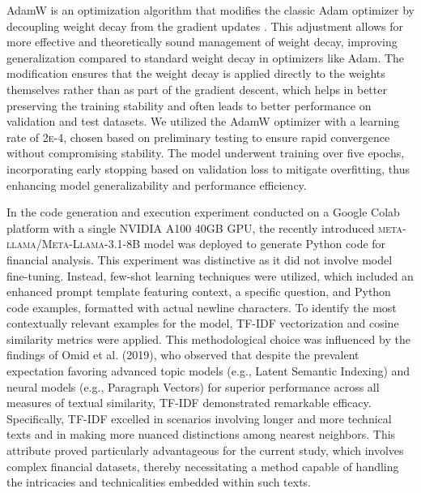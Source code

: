 \documentclass[logo,msc]{infthesis}           %
\begin{document}
AdamW is an optimization algorithm that modifies the classic Adam optimizer by decoupling weight decay from the gradient updates \cite{loshchilov2019decoupledweightdecayregularization}. This adjustment allows for more effective and theoretically sound management of weight decay, improving generalization compared to standard weight decay in optimizers like Adam. The modification ensures that the weight decay is applied directly to the weights themselves rather than as part of the gradient descent, which helps in better preserving the training stability and often leads to better performance on validation and test datasets. We utilized the AdamW optimizer with a learning rate of \textsc{2e-4}, chosen based on preliminary testing to ensure rapid convergence without compromising stability. The model underwent training over five epochs, incorporating early stopping based on validation loss to mitigate overfitting, thus enhancing model generalizability and performance efficiency.

In the code generation and execution experiment conducted on a Google Colab platform with a single NVIDIA A100 40GB GPU, the recently introduced \textsc{meta-llama/Meta-Llama-3.1-8B} model was deployed to generate Python code for financial analysis. This experiment was distinctive as it did not involve model fine-tuning. Instead, few-shot learning techniques were utilized, which included an enhanced prompt template featuring context, a specific question, and Python code examples, formatted with actual newline characters. To identify the most contextually relevant examples for the model, TF-IDF vectorization \cite{8999168} and cosine similarity metrics were applied. This methodological choice was influenced by the findings of Omid et al. (2019), who observed that despite the prevalent expectation favoring advanced topic models (e.g., Latent Semantic Indexing) and neural models (e.g., Paragraph Vectors) for superior performance across all measures of textual similarity, TF-IDF demonstrated remarkable efficacy. Specifically, TF-IDF excelled in scenarios involving longer and more technical texts and in making more nuanced distinctions among nearest neighbors. This attribute proved particularly advantageous for the current study, which involves complex financial datasets, thereby necessitating a method capable of handling the intricacies and technicalities embedded within such texts.

\end{document}
